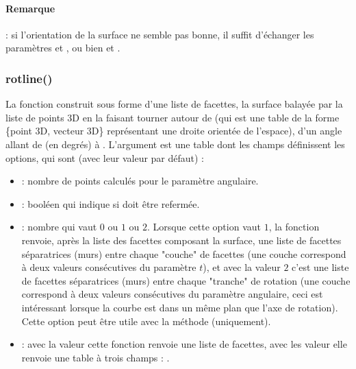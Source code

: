 \paragraph{Remarque} : si l'orientation de la surface ne semble pas bonne, il suffit d'échanger les paramètres  et , ou bien  et .

\subsubsection{rotline()}

La fonction  construit sous forme d'une liste de facettes, la surface balayée par la liste de points 3D  en la faisant tourner autour de  (qui est une table de la forme \{point 3D, vecteur 3D\} représentant une droite orientée de l'espace), d'un angle allant de  (en degrés) à . L'argument  est une table dont les champs définissent les options, qui sont (avec leur valeur  par défaut) :
    \begin{itemize}
        \item {} : nombre de points calculés pour le paramètre angulaire.
        
        \item {} : booléen qui indique si  doit être refermée.
        
        \item {} : nombre qui vaut $0$ ou $1$ ou $2$. Lorsque cette option vaut $1$, la fonction renvoie, après la liste des facettes composant la surface, une liste de facettes séparatrices (murs) entre chaque "couche" de facettes (une couche correspond à deux valeurs consécutives du paramètre $t$), et avec la valeur $2$ c'est une liste de facettes séparatrices (murs) entre chaque "tranche" de rotation (une couche correspond à deux valeurs consécutives du paramètre angulaire, ceci est intéressant lorsque la courbe est dans un même plan que l'axe de rotation). Cette option peut être utile avec la méthode  (uniquement).
        
        \item {} : avec la valeur \false cette fonction renvoie une liste de facettes, avec les valeur \true elle renvoie une table à trois champs : .           
        \end{itemize} 
        
